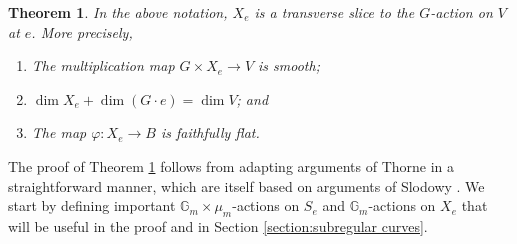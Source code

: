 \documentclass{article} %
\newtheorem{theorem}[proposition]{Theorem}
\numberwithin{equation}{section}
\theoremstyle{definition}
\newcommand{\G}{\mathbb{G}}
\begin{document}
\begin{theorem}\label{theorem: slodowy slice is a transverse slice}
In the above notation, $X_e$ is a transverse slice to the $G$-action on $V$ at $e$.
More precisely,
\begin{enumerate}
    \item The multiplication map $G\times X_e\rightarrow V$ is smooth;
    \item $\dim X_e +\dim(G\cdot e) = \dim V$; and
    \item The map $\varphi\colon X_e\rightarrow B$ is faithfully flat.
\end{enumerate}
\end{theorem}

The proof of Theorem \ref{theorem: slodowy slice is a transverse slice} follows from adapting arguments of Thorne \cite[\S3]{Thorne-thesis} in a straightforward manner, which are itself based on arguments of Slodowy \cite[\S7.4]{Slodowy-simplesingularitiesalggroups}.
We start by defining important $\G_m\times \mu_m$-actions on $S_e$ and $\G_m$-actions on $X_e$ that will be useful in the proof and in Section \ref{section:subregular curves}.
\end{document}
